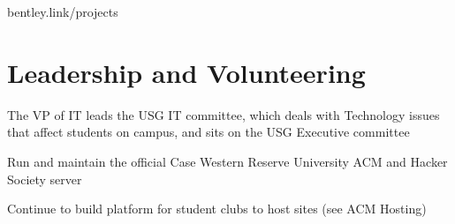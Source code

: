 \documentclass[letterpaper]{deedy-resume} %
\begin{document}
\begin{minipage}[t]{0.66\textwidth}
\sectionspace %

 bentley.link/projects
\sectionspace


\section{Leadership and Volunteering}


\begin{tightitemize}
\item The VP of IT leads the USG IT committee, which deals with Technology
  issues that affect students on campus, and sits on the USG Executive committee
\end{tightitemize}

\sectionspace %



\begin{tightitemize}
\item Run and maintain the official Case Western Reserve University ACM and
  Hacker Society server
\item Continue to build platform for student clubs to host sites (see ACM Hosting)
\end{tightitemize}



%
%


\end{minipage} %
\end{document}
